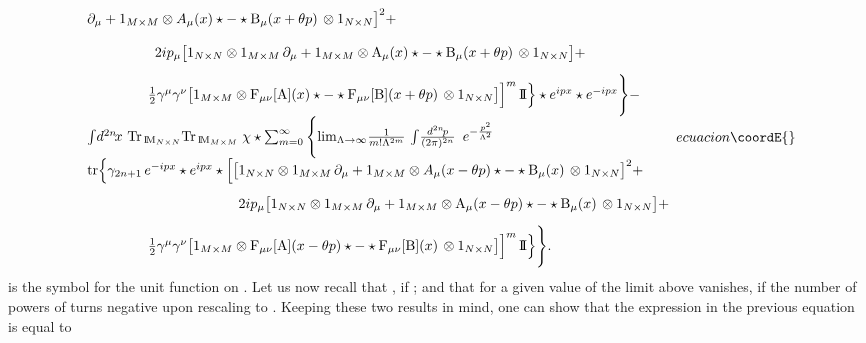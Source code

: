 \documentclass[a4paper,12pt]{article}
\def\A{{\rm A}}
\def\B{{\rm B}}
\def\idpn{\int\! \frac{d^{2n}\!p}{(2\pi)^{2n}} \,\,}
\def\idxn{\int\! d^{2n}\!x \,}
\def\ot{\otimes}
\def\RR{{\rm I\!\!\, R}}
\def\MM{{\rm I\!\!\, M}}
\def\unit{{\rm I\!\!\, I}}
\begin{document}
\begin{equation}
{\begin{array}{l}
{\partial_{\mu}+1_{M\times M}\ot A_{\mu}(x)\star -
\star\B_{\mu}(x+\theta p)\,\ot 1_{N\times N}\big]^2+}\\[9pt]
{\phantom{{\rm tr}\Big\{\gamma_{2n+1}\,\Big[\;}2ip_{\mu}
\big[1_{N\times N}\ot 1_{M\times M}\,
\partial_{\mu}+1_{M\times M}\ot\A_{\mu}(x)\star -
\star\B_{\mu}(x+\theta p)\,\ot 1_{N\times N}\big]+}\\[9pt]
{\phantom{\Big\{\gamma_{2n+1}\,\Big[[\;}\frac{1}{2}
\gamma^{\mu}\gamma^{\nu}\big[1_{M\times M}\ot {\rm F}_{\mu\nu}[\A](x)\star- \star{\rm F}_{\mu\nu}[\B](x+\theta p)\,\ot 1_{N\times N}
\big]\Big]^m\,\unit\Big\}\star e^{ipx}
\star e^{-ipx}\Bigg\}-}\\[9pt]
{\idxn\,{\rm Tr}_{\,\MM_{N\times N}}{\rm Tr}_{\,\MM_{M\times M}} \;
\chi\star\sum_{m=0}^{\infty}\Bigg\{
\mbox{lim}_{\Lambda\rightarrow\infty}\frac{1}{m!\Lambda^{2m}}  
\,\idpn\,e^{-\frac{p^2}{\Lambda^2}}}\\[9pt]
{{\rm tr}\Big\{\gamma_{2n+1}\, e^{-ipx}\star e^{ipx}\star
\Big[\big[1_{N\times N}\ot 1_{M\times M}\,\partial_{\mu}+ 1_{M\times M}\ot A_{\mu}(x-\theta p)\star -\star\B_{\mu}(x)\,\ot 1_{N\times N}\big]^2+}\\[9pt]
{\phantom{{\rm tr}\Big\{\gamma_{2n+1}\, e^{-ipx}\star e^{ipx}\star
\Big[\big[} 2ip_{\mu}\big[1_{N\times N}\ot 1_{M\times M}\,
\partial_{\mu}+ 1_{M\times M}\ot \A_{\mu}(x-\theta p)\star -
\star\B_{\mu}(x)\,\ot 1_{N\times N}\big]+}\\[9pt]
{\phantom{\Big\{\gamma_{2n+1}\,\Big[[\;}\frac{1}{2}
\gamma^{\mu}\gamma^{\nu}\big[1_{M\times M}\ot {\rm F}_{\mu\nu}[\A](x-\theta p)\star- \star{\rm F}_{\mu\nu}[\B](x)\,\ot 1_{N\times N}\big]\Big]^m\,\unit\Big\}\Bigg\}.}\\[9pt]
\end{array}
}{ecuacion}\coordE{}\end{equation}
\myHighlight{$\unit$}\coordHE{} is the symbol for the unit function on \myHighlight{$\RR^{2n}$}\coordHE{}. Let us now recall that
\coordHE{}, if 
\coordHE{}; and that for a given value of \coordHE{} the limit 
\myHighlight{${\lim}_{\Lambda\rightarrow\infty}$}\coordHE{} above vanishes, if the number of powers 
of \myHighlight{$\Lambda$}\coordHE{} turns negative upon  rescaling \coordHE{} to \coordHE{}. Keeping these 
two results in mind, one can show that 
the expression in the previous equation is equal to
\end{document}

